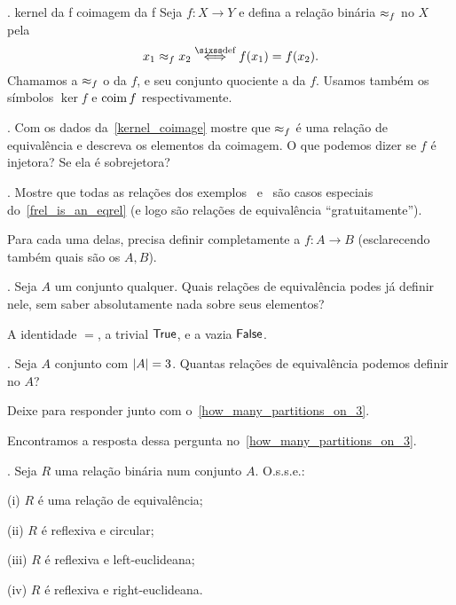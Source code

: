 \endexercise

.
\label{kernel_coimage}
 {kernel da \holed f}
 {coimagem da \holed f}
Seja $f : X \to Y$ e defina a relação binária $\approx_{f}$ no $X$ pela
$$
x_1 \frel f x_2 \defiff f(x_1)=f(x_2).
$$
Chamamos a $\approx_{f}$ o  da $f$, e seu conjunto quociente
a  da $f$.
Usamos também os símbolos $\ker f$ e $\operatorname{coim} f$ respectivamente.

\exercise.
\label{frel_is_an_eqrel}%
Com os dados da~\ref{kernel_coimage}
mostre que $\approx_{f}$ é uma relação de equivalência e descreva os elementos da coimagem.
O que podemos dizer se $f$ é injetora?
Se ela é sobrejetora?

\endexercise

\exercise.
Mostre que todas as relações dos
exemplos~
e~
são casos especiais do~\ref{frel_is_an_eqrel}
(e logo são relações de equivalência ``gratuitamente'').

\hint
Para cada uma delas, precisa definir completamente a
$f : A \to B$ (esclarecendo também quais são os $A,B$).

\endexercise

\exercise.
\label{guaranteed_eqrels}%
Seja $A$ um conjunto qualquer.
Quais relações de equivalência podes já definir nele,
sem saber absolutamente nada sobre seus elementos?

\solution
A identidade $=$, a trivial $\hbox{\sf True}$, e a vazia $\hbox{\sf False}$.

\endexercise

\exercise.
\label{how_many_equivalence_relations_on_3}%
Seja $A$ conjunto com $\left|A\right| = 3$.
Quantas relações de equivalência podemos definir no $A$?

\hint
Deixe para responder junto com o~\ref{how_many_partitions_on_3}.

\solution
Encontramos a resposta dessa pergunta no~\ref{how_many_partitions_on_3}.

\endexercise

\exercise.
\label{equivalent_properties_to_eqrel}%
Seja $R$ uma relação binária num conjunto $A$.
O.s.s.e.:
\item{(i)}   $R$ é uma relação de equivalência;
\item{(ii)}  $R$ é reflexiva e circular;
\item{(iii)} $R$ é reflexiva e left-euclideana;
\item{(iv)}  $R$ é reflexiva e right-euclideana.

